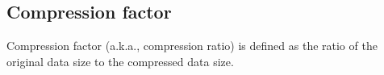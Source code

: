 \subsection{Compression factor}

Compression factor (a.k.a., compression ratio) is defined as the ratio of the original data size to the compressed data size. 
